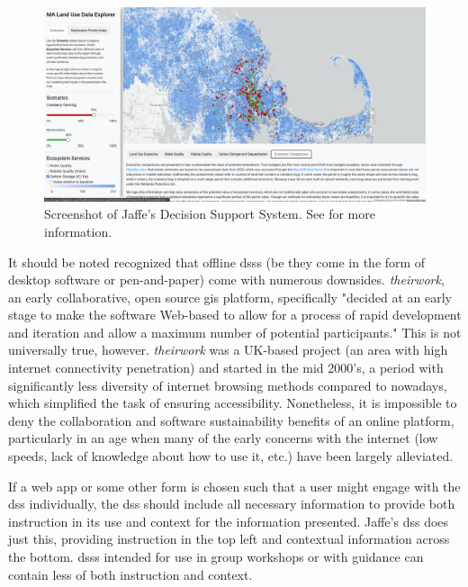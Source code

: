 \begin{figure}[h]
	\centering
	\includegraphics[scale=0.2]{Figures/chap3/jaffe_application.png}
	\caption[Screenshot of Jaffe's Decision Support System] {Screenshot of Jaffe's Decision Support System. See \cite{jaffeEnvironmentalEconomicSystems2022} for more information.}
	\label{fig:jaffe_application}
\end{figure}

It should be noted recognized that offline \acp{dss} (be they come in the form of desktop software or pen-and-paper) come with numerous downsides. \textit{theirwork}, an early collaborative, open source \ac{gis} platform, specifically "decided at an early stage to make the software Web-based to allow for a process of rapid development and iteration and allow a maximum number of potential participants." \cite{williamsonTheirworkDevelopmentSustainable2011} This is not universally true, however. \textit{theirwork} was a UK-based project (an area with high internet connectivity penetration) and started in the mid 2000's, a period with significantly less diversity of internet browsing methods compared to nowadays, which simplified the task of ensuring accessibility. Nonetheless, it is impossible to deny the collaboration and software sustainability benefits of an online platform, particularly in an age when many of the early concerns with the internet (low speeds, lack of knowledge about how to use it, etc.) \cite{shifterInteractiveMultimediaPlanning1995} have been largely alleviated.

If a web app or some other form is chosen such that a user might engage with the \ac{dss} individually, the \ac{dss} should include all necessary information to provide both instruction in its use and context for the information presented. Jaffe's \ac{dss} does just this, providing instruction in the top left and contextual information across the bottom. \acp{dss} intended for use in group workshops or with guidance can contain less of both instruction and context.

